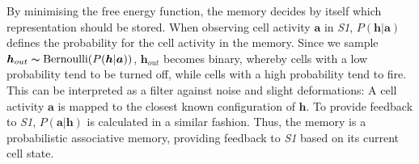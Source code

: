 By minimising the free energy function, the memory decides by itself which representation should be stored.
When observing cell activity $\boldsymbol{a}$ in \emph{S1}, $P(\boldsymbol{h}|\boldsymbol{a})$ defines the probability for the cell activity in the memory. Since we sample $\boldsymbol{h}_{out} \thicksim \text{Bernoulli}(P(\boldsymbol{h} | \boldsymbol{a}) )$, $\boldsymbol{h}_{out}$ becomes binary, whereby cells with a low probability tend to be turned off, while cells with a high probability tend to fire.
This can be interpreted as a filter against noise and slight deformations: A cell activity $\boldsymbol{a}$ is mapped to the closest known configuration of $\boldsymbol{h}$.
To provide feedback to \emph{S1}, $P(\boldsymbol{a}|\boldsymbol{h})$ is calculated in a similar fashion. Thus, the memory is a probabilistic associative memory, providing feedback to \emph{S1} based on its current cell state.





